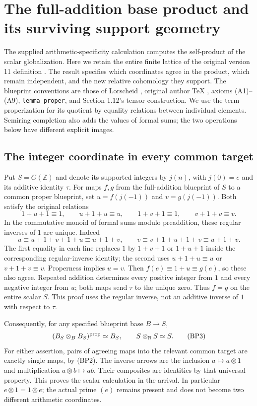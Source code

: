 \documentclass[11pt,a4paper]{article}
\theoremstyle{definition}\newtheorem{definition}[theorem]{Definition}
\begin{document}
\section{The full-addition base product and its surviving support geometry}
\label{sec:full-support-base-product}

The supplied arithmetic-specificity calculation computes the self-product
of the scalar globalization. Here we retain the entire finite lattice
of the original version 11 definition \cite{support}. The result specifies
which coordinates agree in the product, which remain independent, and
the new relative cohomology they support. The blueprint conventions are
those of Lorscheid \cite{lorscheid}, original author TeX
, axioms (A1)--(A9),
\texttt{lemma\_proper}, and Section 1.12's tensor construction.
We use the term properization for its quotient by equality relations
between individual elements. Semiring completion also adds the values
of formal sums; the two operations below have different explicit images.

\subsection{The integer coordinate in every common target}

Put $S=G(\mathbb Z)$ and denote its supported integers by $j(n)$,
with $j(0)=e$ and its additive identity $\tau$. For maps $f,g$ from
the full-addition blueprint of $S$ to a common proper blueprint, set
$u=f(j(-1))$ and $v=g(j(-1))$. Both satisfy the original relations
\[
 1+u+1\equiv1,\qquad u+1+u\equiv u,
 \qquad 1+v+1\equiv1,\qquad v+1+v\equiv v.
 \tag{BP1}
\]
In the commutative monoid of formal sums modulo preaddition,
these regular inverses of $1$ are unique. Indeed
\[
 u\equiv u+1+v+1+u\equiv u+1+v,
 \qquad v\equiv v+1+u+1+v\equiv u+1+v.
 \tag{BP2}
\]
The first equality in each line replaces $1$ by $1+v+1$ or
$1+u+1$ inside the corresponding regular-inverse identity;
the second uses $u+1+u\equiv u$ or $v+1+v\equiv v$.
Properness implies $u=v$. Then $f(e)\equiv1+u\equiv g(e)$,
so these also agree. Repeated addition determines every positive
integer from $1$ and every negative integer from $u$; both maps send
$\tau$ to the unique zero. Thus $f=g$ on the entire scalar $S$.
This proof uses the regular inverse, not an additive inverse of $1$
with respect to $\tau$.

Consequently, for any specified blueprint base $B\to S$,
\[
 (B_S\otimes_B B_S)^{\rm prop}\simeq B_S,
 \qquad S\otimes_{\mathbb N}S\simeq S.
 \tag{BP3}
\]
For either assertion, pairs of agreeing maps into the relevant common
target are exactly single maps, by (BP2). The inverse arrows are
the inclusion $a\mapsto a\otimes1$ and multiplication
$a\otimes b\mapsto ab$. Their composites are identities by that
universal property. This proves the scalar calculation in the arrival.
In particular $e\otimes1=1\otimes e$; the actual prime $(e)$ remains
present and does not become two different arithmetic coordinates.
\end{document}
